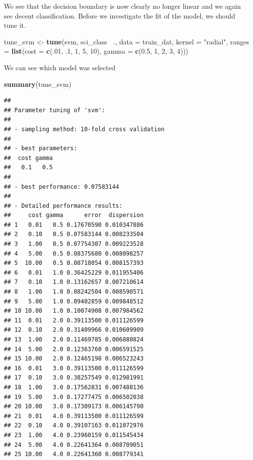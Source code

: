 \documentclass[]{book}
\newenvironment{Shaded}{\begin{snugshade}}{\end{snugshade}}
\newcommand{\DataTypeTok}[1]{\textcolor[rgb]{0.13,0.29,0.53}{#1}}
\newcommand{\DecValTok}[1]{\textcolor[rgb]{0.00,0.00,0.81}{#1}}
\newcommand{\FloatTok}[1]{\textcolor[rgb]{0.00,0.00,0.81}{#1}}
\newcommand{\KeywordTok}[1]{\textcolor[rgb]{0.13,0.29,0.53}{\textbf{#1}}}
\newcommand{\NormalTok}[1]{#1}
\newcommand{\OperatorTok}[1]{\textcolor[rgb]{0.81,0.36,0.00}{\textbf{#1}}}
\newcommand{\StringTok}[1]{\textcolor[rgb]{0.31,0.60,0.02}{#1}}
\begin{document}
We see that the decision boundary is now clearly no longer linear and we again see decent classification. Before we investigate the fit of the model, we should tune it.

\begin{Shaded}
\begin{Highlighting}[]
\NormalTok{tune_svm <-}\StringTok{ }\KeywordTok{tune}\NormalTok{(svm, sci_class }\OperatorTok{~}\NormalTok{., }\DataTypeTok{data =}\NormalTok{ train_dat,}
                 \DataTypeTok{kernel =} \StringTok{"radial"}\NormalTok{,}
                 \DataTypeTok{ranges =} \KeywordTok{list}\NormalTok{(}\DataTypeTok{cost =} \KeywordTok{c}\NormalTok{(.}\DecValTok{01}\NormalTok{, }\FloatTok{.1}\NormalTok{, }\DecValTok{1}\NormalTok{, }\DecValTok{5}\NormalTok{, }\DecValTok{10}\NormalTok{),}
                               \DataTypeTok{gamma =} \KeywordTok{c}\NormalTok{(}\FloatTok{0.5}\NormalTok{, }\DecValTok{1}\NormalTok{, }\DecValTok{2}\NormalTok{, }\DecValTok{3}\NormalTok{, }\DecValTok{4}\NormalTok{)))}
\end{Highlighting}
\end{Shaded}

We can see which model was selected

\begin{Shaded}
\begin{Highlighting}[]
\KeywordTok{summary}\NormalTok{(tune_svm)}
\end{Highlighting}
\end{Shaded}

\begin{verbatim}
## 
## Parameter tuning of 'svm':
## 
## - sampling method: 10-fold cross validation 
## 
## - best parameters:
##  cost gamma
##   0.1   0.5
## 
## - best performance: 0.07583144 
## 
## - Detailed performance results:
##     cost gamma      error  dispersion
## 1   0.01   0.5 0.17670590 0.010347886
## 2   0.10   0.5 0.07583144 0.008233504
## 3   1.00   0.5 0.07754307 0.009223528
## 4   5.00   0.5 0.08375680 0.008098257
## 5  10.00   0.5 0.08718054 0.008157393
## 6   0.01   1.0 0.36425229 0.011955406
## 7   0.10   1.0 0.13162657 0.007210614
## 8   1.00   1.0 0.08242504 0.008590571
## 9   5.00   1.0 0.09402859 0.009848512
## 10 10.00   1.0 0.10074908 0.007984562
## 11  0.01   2.0 0.39113500 0.011126599
## 12  0.10   2.0 0.31409966 0.010609909
## 13  1.00   2.0 0.11469785 0.006880824
## 14  5.00   2.0 0.12363760 0.006591525
## 15 10.00   2.0 0.12465198 0.006523243
## 16  0.01   3.0 0.39113500 0.011126599
## 17  0.10   3.0 0.38257549 0.012981991
## 18  1.00   3.0 0.17562831 0.007488136
## 19  5.00   3.0 0.17277475 0.006502038
## 20 10.00   3.0 0.17309173 0.006145790
## 21  0.01   4.0 0.39113500 0.011126599
## 22  0.10   4.0 0.39107163 0.011072976
## 23  1.00   4.0 0.23960159 0.011545434
## 24  5.00   4.0 0.22641364 0.008709051
## 25 10.00   4.0 0.22641360 0.008779341
\end{verbatim}
\end{document}
